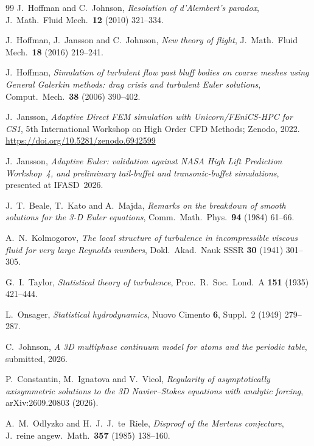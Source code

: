 \documentclass[11pt]{article}
\begin{document}
\begin{thebibliography}{99}
 J.~Hoffman and C.~Johnson, \emph{Resolution of d'Alembert's paradox},
J.\ Math.\ Fluid Mech.\ \textbf{12} (2010) 321--334.

 J.~Hoffman, J.~Jansson and C.~Johnson, \emph{New theory of flight},
J.\ Math.\ Fluid Mech.\ \textbf{18} (2016) 219--241.

 J.~Hoffman, \emph{Simulation of turbulent flow past bluff bodies on coarse
meshes using General Galerkin methods: drag crisis and turbulent Euler solutions}, Comput.\ Mech.\
\textbf{38} (2006) 390--402.

 J.~Jansson, \emph{Adaptive Direct FEM simulation with Unicorn/FEniCS-HPC for CS1},
5th International Workshop on High Order CFD Methods; Zenodo, 2022.
\newblock \url{https://doi.org/10.5281/zenodo.6942599}

 J.~Jansson, \emph{Adaptive Euler: validation against NASA High Lift Prediction
Workshop~4, and preliminary tail-buffet and transonic-buffet simulations}, presented at IFASD~2026.

 J.~T.~Beale, T.~Kato and A.~Majda, \emph{Remarks on the breakdown of smooth solutions
for the 3-D Euler equations}, Comm.\ Math.\ Phys.\ \textbf{94} (1984) 61--66.

 A.~N.~Kolmogorov, \emph{The local structure of turbulence in incompressible
viscous fluid for very large Reynolds numbers}, Dokl.\ Akad.\ Nauk SSSR \textbf{30} (1941) 301--305.

 G.~I.~Taylor, \emph{Statistical theory of turbulence}, Proc.\ R.\ Soc.\ Lond.\ A
\textbf{151} (1935) 421--444.

 L.~Onsager, \emph{Statistical hydrodynamics}, Nuovo Cimento \textbf{6},
Suppl.~2 (1949) 279--287.

 C.~Johnson, \emph{A 3D multiphase continuum model for atoms and the periodic
table}, submitted, 2026.

 P.~Constantin, M.~Ignatova and V.~Vicol, \emph{Regularity of asymptotically
axisymmetric solutions to the 3D Navier--Stokes equations with analytic forcing}, arXiv:2609.20803
(2026).

 A.~M.~Odlyzko and H.~J.~J.~te~Riele, \emph{Disproof of the Mertens conjecture},
J.\ reine angew.\ Math.\ \textbf{357} (1985) 138--160.

\end{thebibliography}
\end{document}

